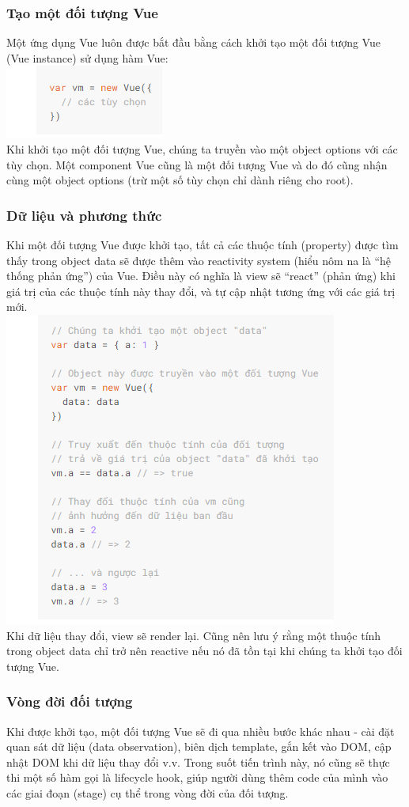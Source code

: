 \documentclass[12pt,a4paper]{report}
\begin{document}
\subsubsection{Tạo một đối tượng Vue}
Một ứng dụng Vue luôn được bắt đầu bằng cách khởi tạo một đối tượng Vue (Vue instance) sử dụng hàm Vue:\\
	\includegraphics[scale=1]{7}
\\Khi khởi tạo một đối tượng Vue, chúng ta truyền vào một object options với các tùy chọn. Một component Vue cũng là một đối tượng Vue và do đó cũng nhận cùng một object options (trừ một số tùy chọn chỉ dành riêng cho root). \subsubsection{Dữ liệu và phương thức} Khi một đối tượng Vue được khởi tạo, tất cả các thuộc tính (property) được tìm thấy trong object data sẽ được thêm vào reactivity system (hiểu nôm na là “hệ thống phản ứng”) của Vue. Điều này có nghĩa là view sẽ “react” (phản ứng) khi giá trị của các thuộc tính này thay đổi, và tự cập nhật tương ứng với các giá trị mới.\\
\includegraphics[scale=1]{8}\\Khi dữ liệu thay đổi, view sẽ render lại. Cũng nên lưu ý rằng một thuộc tính trong object data chỉ trở nên reactive nếu nó đã tồn tại khi chúng ta khởi tạo đối tượng Vue.\subsubsection{Vòng đời đối tượng} Khi được khởi tạo, một đối tượng Vue sẽ đi qua nhiều bước khác nhau - cài đặt quan sát dữ liệu (data observation), biên dịch template, gắn kết vào DOM, cập nhật DOM khi dữ liệu thay đổi v.v. Trong suốt tiến trình này, nó cũng sẽ thực thi một số hàm gọi là lifecycle hook, giúp người dùng thêm code của mình vào các giai đoạn (stage) cụ thể trong vòng đời của đối tượng. 
\end{document}
